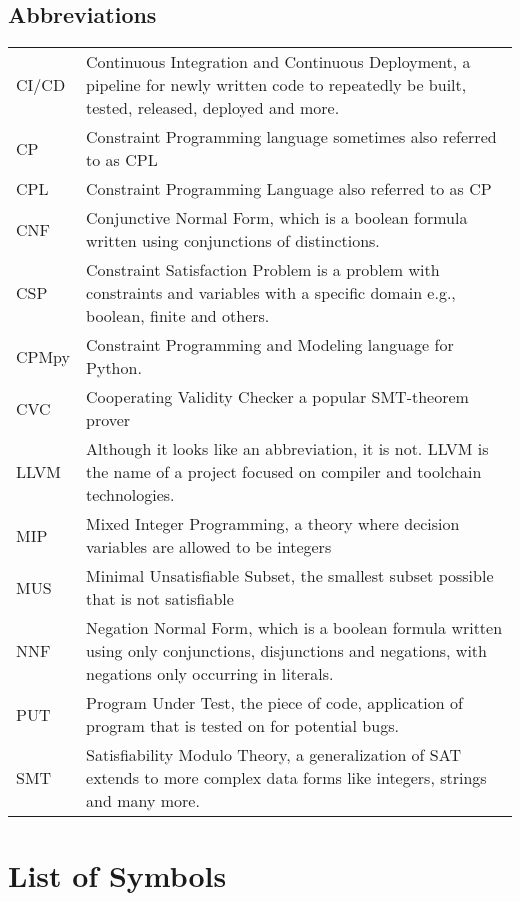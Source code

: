 \documentclass[master=cws, masteroption=se, english, oneside]{kulemt} %
\begin{document}
\section*{Abbreviations}
\begin{flushleft}
	\renewcommand{\arraystretch}{1.1}
	\begin{tabularx}{\textwidth}{@{}p{14mm}X@{}}
		
		CI/CD & Continuous Integration and Continuous Deployment, a pipeline for newly written code to repeatedly be built, tested, released, deployed and more. \\
		CP & Constraint Programming language sometimes also referred to as CPL \\
		CPL & Constraint Programming Language also referred to as CP \\
		CNF & Conjunctive Normal Form, which is a boolean formula written using conjunctions of distinctions. \\
		CSP & Constraint Satisfaction Problem is a problem with constraints and variables with a specific domain e.g., boolean, finite and others.\\
		CPMpy & Constraint Programming and Modeling language for Python.\\
		CVC & Cooperating Validity Checker a popular SMT-theorem prover \\
		LLVM & Although it looks like an abbreviation, it is not. LLVM is the name of a project focused on compiler and toolchain technologies. \\
		MIP & Mixed Integer Programming, a theory where decision variables are allowed to be integers \\
		MUS & Minimal Unsatisfiable Subset, the smallest subset possible that is not satisfiable \\
		NNF & Negation Normal Form, which is a boolean formula written using only  conjunctions, disjunctions and negations, with negations only occurring in literals. \\
		PUT & Program Under Test, the piece of code, application of program that is tested on for potential bugs. \\
		SMT & Satisfiability Modulo Theory, a generalization of SAT extends to more complex data forms like integers, strings and many more.\\
	\end{tabularx}
\end{flushleft}

\chapter{List of Symbols}
\end{document}
